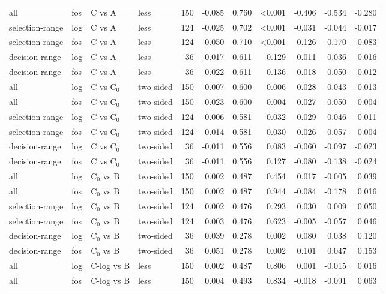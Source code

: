 \begin{longtable}{llllrrrrrrr}
all & fos & C vs A & less & 150 & -0.085 & 0.760 & <0.001 & -0.406 & -0.534 & -0.280 \\
selection-range & log & C vs A & less & 124 & -0.025 & 0.702 & <0.001 & -0.031 & -0.044 & -0.017 \\
selection-range & fos & C vs A & less & 124 & -0.050 & 0.710 & <0.001 & -0.126 & -0.170 & -0.083 \\
decision-range & log & C vs A & less & 36 & -0.017 & 0.611 & 0.129 & -0.011 & -0.036 & 0.016 \\
decision-range & fos & C vs A & less & 36 & -0.022 & 0.611 & 0.136 & -0.018 & -0.050 & 0.012 \\
all & log & C vs C$_0$ & two-sided & 150 & -0.007 & 0.600 & 0.006 & -0.028 & -0.043 & -0.013 \\
all & fos & C vs C$_0$ & two-sided & 150 & -0.023 & 0.600 & 0.004 & -0.027 & -0.050 & -0.004 \\
selection-range & log & C vs C$_0$ & two-sided & 124 & -0.006 & 0.581 & 0.032 & -0.029 & -0.046 & -0.011 \\
selection-range & fos & C vs C$_0$ & two-sided & 124 & -0.014 & 0.581 & 0.030 & -0.026 & -0.057 & 0.004 \\
decision-range & log & C vs C$_0$ & two-sided & 36 & -0.011 & 0.556 & 0.083 & -0.060 & -0.097 & -0.023 \\
decision-range & fos & C vs C$_0$ & two-sided & 36 & -0.011 & 0.556 & 0.127 & -0.080 & -0.138 & -0.024 \\
all & log & C$_0$ vs B & two-sided & 150 & 0.002 & 0.487 & 0.454 & 0.017 & -0.005 & 0.039 \\
all & fos & C$_0$ vs B & two-sided & 150 & 0.002 & 0.487 & 0.944 & -0.084 & -0.178 & 0.016 \\
selection-range & log & C$_0$ vs B & two-sided & 124 & 0.002 & 0.476 & 0.293 & 0.030 & 0.009 & 0.050 \\
selection-range & fos & C$_0$ vs B & two-sided & 124 & 0.003 & 0.476 & 0.623 & -0.005 & -0.057 & 0.046 \\
decision-range & log & C$_0$ vs B & two-sided & 36 & 0.039 & 0.278 & 0.002 & 0.080 & 0.038 & 0.120 \\
decision-range & fos & C$_0$ vs B & two-sided & 36 & 0.051 & 0.278 & 0.002 & 0.101 & 0.047 & 0.153 \\
all & log & C-log vs B & less & 150 & 0.002 & 0.487 & 0.806 & 0.001 & -0.015 & 0.016 \\
all & fos & C-log vs B & less & 150 & 0.004 & 0.493 & 0.834 & -0.018 & -0.091 & 0.063 \\

\end{longtable}
